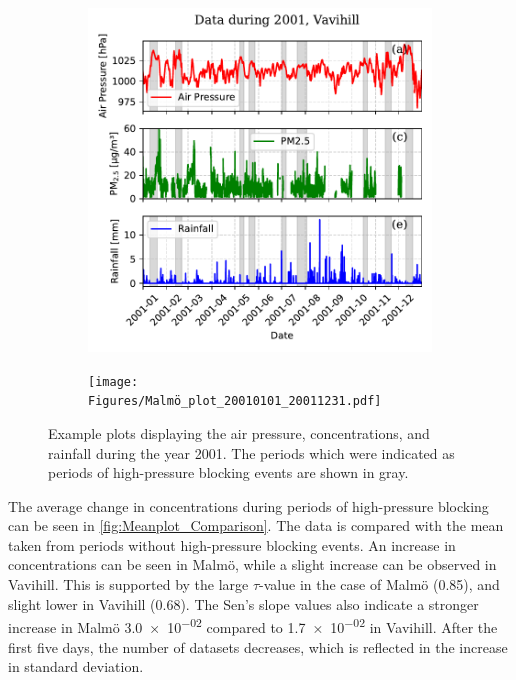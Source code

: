 \begin{figure}[H]
    \centering
    \begin{subfigure}[b]{0.49\textwidth}
        \centering
        \includegraphics[width=\textwidth]{Figures/Vavihill_plot_20010101_20011231.pdf}
        \label{fig:2001Vavihill}
    \end{subfigure}
    \hfill
    \begin{subfigure}[b]{0.49\textwidth}
        \centering
        \texttt{[image: Figures/Malmö\_plot\_20010101\_20011231.pdf]}
        \label{fig:2001Malmö}
    \end{subfigure}
    \caption{Example plots displaying the air pressure, \PM concentrations, and rainfall during the year 2001. The periods which were indicated as periods of high-pressure blocking events are shown in gray. }
    \label{fig:2001}
\end{figure}

The average change in \PM concentrations during periods of high-pressure blocking can be seen in \autoref{fig:Meanplot_Comparison}. The data is compared with the \PM mean taken from periods without high-pressure blocking events. An increase in \PM concentrations can be seen in Malmö, while a slight increase can be observed in Vavihill. This is supported by the large $\tau$-value in the case of Malmö (0.85), and slight lower in Vavihill (0.68). The Sen's slope values also indicate a stronger increase in Malmö \SI{3.0e-02}{} compared to \SI{1.7e-02}{} in Vavihill. After the first five days, the number of datasets decreases, which is reflected in the increase in standard deviation.


